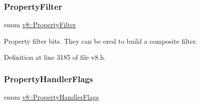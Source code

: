 \subsubsection{\texorpdfstring{Property\+Filter}{PropertyFilter}}
{\footnotesize\ttfamily enum \mbox{\hyperlink{namespacev8_afbf02b6b1152a3e25d7bde90798209ac}{v8\+::\+Property\+Filter}}}

Property filter bits. They can be or\textquotesingle{}ed to build a composite filter. 

Definition at line 3185 of file v8.\+h.

\mbox{\label{namespacev8_af4789f0aeb8680e353901a35810cac1a}} 
\subsubsection{\texorpdfstring{Property\+Handler\+Flags}{PropertyHandlerFlags}}
{\footnotesize\ttfamily enum \mbox{\hyperlink{namespacev8_af4789f0aeb8680e353901a35810cac1a}{v8\+::\+Property\+Handler\+Flags}}\hspace{0.3cm}{\ttfamily [strong]}}

